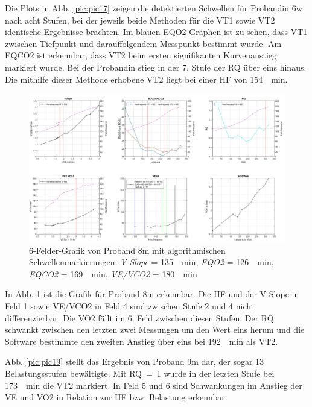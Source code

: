 %
Die Plots in Abb. \ref{pic:pic17} zeigen die detektierten Schwellen für Probandin 6w nach acht Stufen, bei der jeweils beide Methoden für die VT1 sowie VT2 identische Ergebnisse brachten. Im blauen \acs{EQO2}-Graphen ist zu sehen, dass VT1 zwischen Tiefpunkt und darauffolgendem Messpunkt bestimmt wurde. Am \acs{EQCO2} ist erkennbar, dass VT2 beim ersten signifikanten Kurvenanstieg markiert wurde. Bei der Probandin stieg in der 7. Stufe der RQ über eins hinaus. Die mithilfe dieser Methode erhobene VT2 liegt bei einer \acs{HF} von \SI{154}{\per\minute}.
%
\begin{figure}[H]
	\centering
	\noindent\includegraphics[angle=0,width=\linewidth,keepaspectratio]{Bilder/auto_8}
	\caption[6-Felder-Grafik von Proband 8m mit algorithmischen Schwellenmarkierungen]{6-Felder-Grafik von Proband 8m mit algorithmischen Schwellenmarkierungen: \textsl{V-Slope} = \SI{135}{\per\minute}, \textsl{\acs{EQO2}} = \SI{126}{\per\minute}, \textsl{\acs{EQCO2}} = \SI{169}{\per\minute}, \textsl{\acs{VE}/\acs{VCO2}} = \SI{180}{\per\minute}}
	\label{pic:pic18}
\end{figure}
%
In Abb. \ref{pic:pic18} ist die Grafik für Proband 8m erkennbar. Die \acs{HF} und der V-Slope in Feld 1 sowie \acs{VE}/\acs{VCO2} in Feld 4 sind zwischen Stufe 2 und 4 nicht differenzierbar. Die \acs{VO2} fällt im 6. Feld zwischen diesen Stufen. Der RQ schwankt zwischen den letzten zwei Messungen um den Wert eins herum und die Software bestimmte den zweiten Anstieg über eins bei \SI{192}{\per\minute} als VT2.
\par 
Abb. \ref{pic:pic19} stellt das Ergebnis von Proband 9m dar, der sogar 13 Belastungsstufen bewältigte. Mit RQ~=~1 wurde in der letzten Stufe bei \SI{173}{\per\minute} die VT2 markiert. In Feld 5 und 6 sind Schwankungen im Anstieg der \acs{VE} und \acs{VO2} in Relation zur \acs{HF} bzw. Belastung erkennbar.
